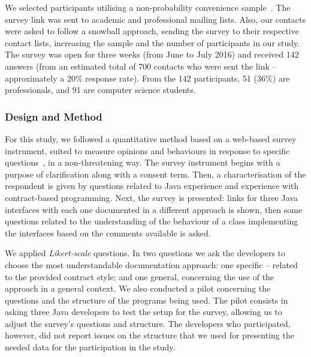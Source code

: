 We selected participants utilising a non-probability convenience sample~\cite{wohlin}. 
The survey link was sent to academic and professional mailing lists.
Also, our contacts were asked to follow a snowball approach, sending the survey to their respective
contact lists, increasing the sample and the number of participants in our study.
The survey was open for three weeks (from June to July 2016) and received 142
answers (from an estimated total of 700 contacts who were sent the link -- approximately a 20\% response
rate). From the 142 participants, 51 (36\%) are professionals, and 91 are computer science students.


\subsubsection{Design and Method}
\label{sec:surveyDes}

For this study, we followed a quantitative method based on a web-based survey instrument, suited to measure opinions and behaviours in response to specific questions~\cite{refSurvey}, in a non-threatening way. 
The survey
instrument
begins with a purpose of clarification along with a consent term.
Then, a characterisation of the respondent is given by questions related to Java experience and experience with contract-based programming. Next, the survey is presented: links for three Java interfaces with each one documented in a different approach is shown, then some questions related to the understanding of the behaviour of a class implementing the interfaces based on the comments available is asked. 

We applied \emph{Likert-scale} questions. In two questions we ask the developers to choose the most understandable documentation approach: one specific -- related to the provided contract style; and one general, concerning the use of the approach in a general context.
We also conducted a pilot concerning the questions and the structure of the programs being used. The pilot consists in asking three Java developers to test the setup for the survey, allowing us to adjust the survey's questions and structure. The developers who participated, however, did not report issues on the structure that we used for presenting the needed data for the participation in the study.

